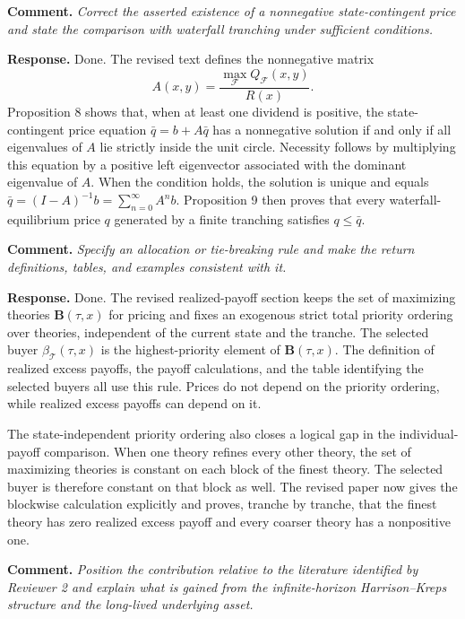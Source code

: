 \documentclass[11pt]{article}
\newcommand{\commenttext}[1]{\par\noindent\textbf{Comment.} \textit{#1}\par}
\newcommand{\response}[1]{\par\noindent\textbf{Response.} #1\par}
\begin{document}
\commenttext{Correct the asserted existence of a nonnegative state-contingent price and state the comparison with waterfall tranching under sufficient conditions.}

\response{Done. The revised text defines the nonnegative matrix
\[
A(x,y)=\frac{\max_{\mathcal F}Q_{\mathcal F}(x,y)}{R(x)}.
\]
Proposition 8 shows that, when at least one dividend is positive, the state-contingent price equation $\bar q=b+A\bar q$ has a nonnegative solution if and only if all eigenvalues of $A$ lie strictly inside the unit circle. Necessity follows by multiplying this equation by a positive left eigenvector associated with the dominant eigenvalue of $A$. When the condition holds, the solution is unique and equals $\bar q=(I-A)^{-1}b=\sum_{n=0}^{\infty}A^n b$. Proposition 9 then proves that every waterfall-equilibrium price $q$ generated by a finite tranching satisfies $q\leq\bar q$.}

\commenttext{Specify an allocation or tie-breaking rule and make the return definitions, tables, and examples consistent with it.}

\response{Done. The revised realized-payoff section keeps the set of maximizing theories $\mathbf B(\tau,x)$ for pricing and fixes an exogenous strict total priority ordering over theories, independent of the current state and the tranche. The selected buyer $\beta_{\mathcal T}(\tau,x)$ is the highest-priority element of $\mathbf B(\tau,x)$. The definition of realized excess payoffs, the payoff calculations, and the table identifying the selected buyers all use this rule. Prices do not depend on the priority ordering, while realized excess payoffs can depend on it.

The state-independent priority ordering also closes a logical gap in the individual-payoff comparison. When one theory refines every other theory, the set of maximizing theories is constant on each block of the finest theory. The selected buyer is therefore constant on that block as well. The revised paper now gives the blockwise calculation explicitly and proves, tranche by tranche, that the finest theory has zero realized excess payoff and every coarser theory has a nonpositive one.}

\commenttext{Position the contribution relative to the literature identified by Reviewer 2 and explain what is gained from the infinite-horizon Harrison--Kreps structure and the long-lived underlying asset.}
\end{document}
